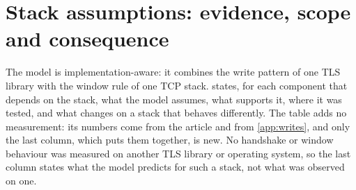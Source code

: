 \documentclass[preprint,12pt]{elsarticle}
\begin{document}
\section{Stack assumptions: evidence, scope and consequence}
\label{app:assumptions}
The model is implementation-aware: it combines the write pattern of one TLS library with the window rule of one TCP stack.  states, for each component that depends on the stack, what the model assumes, what supports it, where it was tested, and what changes on a stack that behaves differently. The table adds no measurement: its numbers come from the article and from \cref{app:writes}, and only the last column, which puts them together, is new. No handshake or window behaviour was measured on another TLS library or operating system, so the last column states what the model predicts for such a stack, not what was observed on one.
\end{document}

